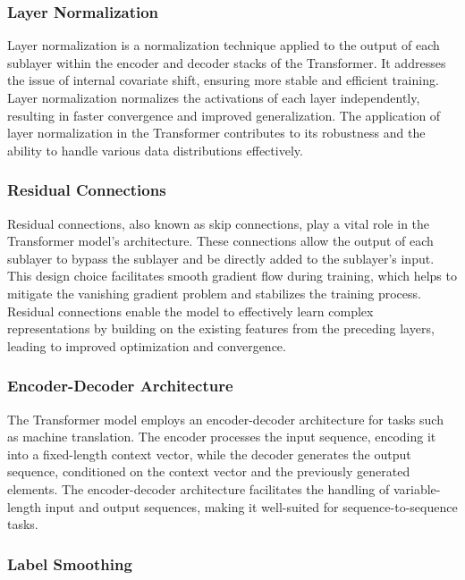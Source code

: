 \documentclass{article}
\begin{document}
\subsubsection{Layer Normalization}

Layer normalization is a normalization technique applied to the output of each sublayer within the encoder and decoder stacks of the Transformer. It addresses the issue of internal covariate shift, ensuring more stable and efficient training. Layer normalization normalizes the activations of each layer independently, resulting in faster convergence and improved generalization. The application of layer normalization in the Transformer contributes to its robustness and the ability to handle various data distributions effectively.

\subsubsection{Residual Connections}

Residual connections, also known as skip connections, play a vital role in the Transformer model's architecture. These connections allow the output of each sublayer to bypass the sublayer and be directly added to the sublayer's input. This design choice facilitates smooth gradient flow during training, which helps to mitigate the vanishing gradient problem and stabilizes the training process. Residual connections enable the model to effectively learn complex representations by building on the existing features from the preceding layers, leading to improved optimization and convergence.

\subsubsection{Encoder-Decoder Architecture}

The Transformer model employs an encoder-decoder architecture for tasks such as machine translation. The encoder processes the input sequence, encoding it into a fixed-length context vector, while the decoder generates the output sequence, conditioned on the context vector and the previously generated elements. The encoder-decoder architecture facilitates the handling of variable-length input and output sequences, making it well-suited for sequence-to-sequence tasks.

\subsubsection{Label Smoothing}
\end{document}
